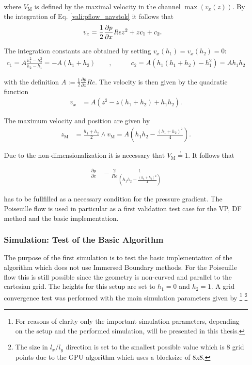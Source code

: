 where $V_\text{M}$ is defined by the maximal velocity in the channel $\max(v_x(z))$.
By the integration of Eq. \ref{vali:pflow_navstok} it follows that
\begin{align}
v_x &= \frac{1}{2}\frac{\partial p}{\partial x}\mbox{\textit{Re}} z^2 + zc_1 + c_2.
\end{align}

The integration constants are obtained by setting $v_x(h_1) = v_x(h_2) = 0$:
\begin{align}
c_1 = A\frac{h_1^2 -h_2^2}{h_2 - h_1} = -A(h_1+h_2)\qquad ,& \qquad
c_2 = A(h_1(h_1 + h_2) - h_1^2) = Ah_1h_2
\end{align}

with the definition $A:=\frac{1}{2}\frac{\partial p}{\partial x} Re$.
The velocity is then given by the quadratic function
\begin{align}
\label{vali:pflow_theosol}
v_x &= A(z^2 - z(h_1 + h_2) + h_1h_2).
\end{align}

The maximum velocity and position are given by
\begin{align}
z_{\text{M}} &= \frac{h_1+h_2}{2} \wedge v_{\text{M}} = A\left(h_1h_2 - \frac{(h_1 + h_2)^2}{4}\right).
\end{align}

Due to the non-dimensionalization it is necessary that $V_{\text{M}} \overset{!}{=}  1$.
It follows that

\begin{align}
    \label{vali:pflow_pcondi}
\frac{\partial p}{\partial x} &= \frac{2}{Re}\frac{1}{\left(h_1h_2 - \frac{(h_1+h_2)^2}{4} \right)}
\end{align}

has to be fullfilled as a necessary condition for the pressure gradient.
The Poiseuille flow is used in particular as a first validation test case
for the VP, DF method  and the basic implementation.

\subsubsection{Simulation: Test of the Basic Algorithm}

The purpose of the first simulation is to test  the basic
implementation of the algorithm which does not use Immersed Boundary methods.
For the Poiseuille flow this is still possible since the geometry is non-curved
and parallel to the cartesian grid. The heights for this setup are set to $h_1=0$ and $h_2=1$.
A grid convergence test was performed with the main simulation parameters given by
\footnote{For reasons of clarity only the important simulation parameters, depending on the setup and the performed simulation,  will be presented in this thesis.}
\footnote{The size in $l_x/l_y$ direction is set to the smallest possible value which is 8 grid points due to the GPU algorithm which uses a blocksize of 8x8.}

